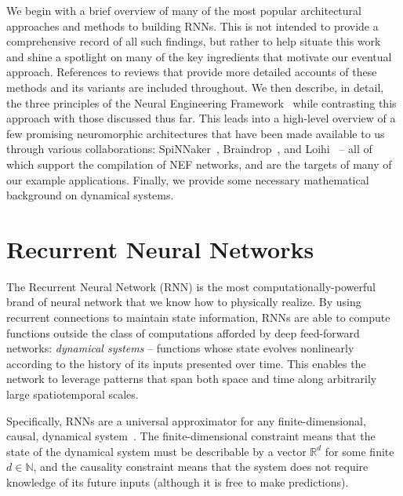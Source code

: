 We begin with a brief overview of many of the most popular architectural approaches and methods to building RNNs.
This is not intended to provide a comprehensive record of all such findings, but rather to help situate this work and shine a spotlight on many of the key ingredients that motivate our eventual approach.
References to reviews that provide more detailed accounts of these methods and its variants are included throughout.
We then describe, in detail, the three principles of the Neural Engineering Framework~\citep[NEF;][]{eliasmith2003a} while contrasting this approach with those discussed thus far.
This leads into a high-level overview of a few promising neuromorphic architectures that have been made available to us through various collaborations: SpiNNaker~\citep{furber2014spinnaker}, Braindrop~\citep{braindrop2019}, and Loihi~\citep{davies2018loihi} -- all of which support the compilation of NEF networks, and are the targets of many of our example applications.
Finally, we provide some necessary mathematical background on dynamical systems.

\section{Recurrent Neural Networks}

The Recurrent Neural Network (RNN) is the most computationally-powerful brand of neural network that we know how to physically realize.
By using recurrent connections to maintain state information, RNNs are able to compute functions outside the class of computations afforded by deep feed-forward networks: \emph{dynamical systems} -- functions whose state evolves nonlinearly according to the history of its inputs presented over time.
This enables the network to leverage patterns that span both space and time along arbitrarily large spatiotemporal scales.

Specifically, RNNs are a universal approximator for any finite-dimensional, causal, dynamical system~\citep{schafer2006recurrent}.
The finite-dimensional constraint means that the state of the dynamical system must be describable by a vector $\mathbb{R}^d$ for some finite $d \in \mathbb{N}$, and the causality constraint means that the system does not require knowledge of its future inputs (although it is free to make predictions).

